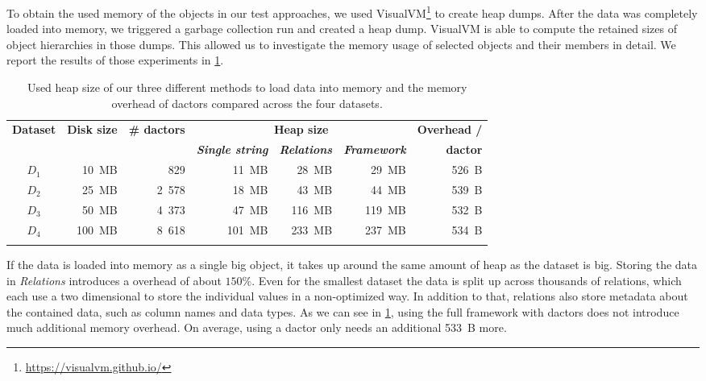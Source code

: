   To obtain the used memory of the objects in our test approaches, we used VisualVM\footnote{\url{https://visualvm.github.io/}} to create heap dumps.
  After the data was completely loaded into memory, we triggered a garbage collection run and created a heap dump.
  VisualVM is able to compute the retained sizes of object hierarchies in those dumps.
  This allowed us to investigate the memory usage of selected objects and their members in detail.
  We report the results of those experiments in \cref{tab:memory_overhead}.
  
  \begin{table}
    \centering
    \begin{tabular}{crrrrrr}
      \toprule
      \multirow{2}{*}{\textbf{Dataset}} & \multirow{2}{*}{\textbf{Disk size}} & \multirow{2}{*}{\textbf{\# \Glspl{dactor}}} & \multicolumn{3}{c}{\textbf{Heap size}} & \textbf{Overhead /}\\
      & & & \textbf{\textit{Single string}} & \textbf{\textit{Relations}} & \textbf{\textit{Framework}} & \textbf{\gls{dactor}}\\
      \midrule
      $D_1$ &  10~MB &   829 &  11~MB &  28~MB &  29~MB & 526~B \\
      $D_2$ &  25~MB & 2~578 &  18~MB &  43~MB &  44~MB & 539~B \\
      $D_3$ &  50~MB & 4~373 &  47~MB & 116~MB & 119~MB & 532~B \\
      $D_4$ & 100~MB & 8~618 & 101~MB & 233~MB & 237~MB & 534~B \\
      \bottomrule& 
    \end{tabular}
    \caption{Used heap size of our three different methods to load data into memory and the memory overhead of \glspl{dactor} compared across the four datasets.}
    \label{tab:memory_overhead}
  \end{table}

  If the data is loaded into memory as a single big  object, it takes up around the same amount of heap as the dataset is big.
  Storing the data in \textit{Relations} introduces a overhead of about $150 \%$.
  Even for the smallest dataset the data is split up across thousands of relations, which each use a two dimensional  to store the individual values in a non-optimized way.
  In addition to that, relations also store metadata about the contained data, such as column names and data types.
  As we can see in \cref{tab:memory_overhead}, using the full framework with \glspl{dactor} does not introduce much additional memory overhead.
  On average, using a \gls{dactor} only needs an additional 533~B more.
  
